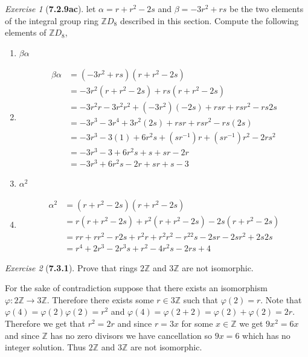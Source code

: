 \documentclass[12pt]{amsart}
\makeatletter
\theoremstyle{remark}
\newtheorem*{exercise}{Exercise}%
\def\ZZ{\ensuremath{\mathbb Z}}
\renewenvironment{proof}[1][\proofname]{\par\doublespacing
  \pushQED{\qed}%
  \normalfont \topsep6\p@\@plus6\p@\relax
  \list{}{%
    \settowidth{\leftmargin}{\itshape\proofname:\hskip\labelsep}%
    \setlength{\labelwidth}{0pt}%
    \setlength{\itemindent}{-\leftmargin}%
  }%
  \item[\hskip\labelsep\itshape#1\@addpunct{:}]\ignorespaces
}{%
  \popQED\endlist\@endpefalse
  \singlespacing
}
\theoremstyle{mycomment}
\makeatother
\begin{document}
\begin{exercise}[\textbf{7.2.9ac}] let $\alpha = r + r^2 - 2s$ and $\beta = -3r^2 + rs$ be the two elements of the integral group ring 
  $\ZZ D_8$ described in this section. Compute the following elements of $\ZZ D_8$,
  \begin{enumerate}
    \item[(a)] $\beta\alpha$
    \begin{proof}
      \begin{align*}
        \beta\alpha &= (-3r^2 + rs)(r + r^2 - 2s)\\
         &= -3r^2(r + r^2 - 2s) + rs(r + r^2 - 2s)\\
         &= -3r^2r - 3r^2r^2 + (-3r^2)(-2s) + rsr + rsr^2 - rs2s\\
         &= -3r^3 - 3r^4 + 3r^2(2s) + rsr + rsr^2 - rs(2s)\\
         &= -3r^3 - 3(1) + 6r^2s + (sr^{-1})r + (sr^{-1})r^2 - 2rs^2\\
         &= -3r^3 - 3 + 6r^2s + s + sr - 2r\\
         &= -3r^3 + 6r^2s - 2r + sr + s - 3
      \end{align*}
    \end{proof}
      \vspace{.15in}


      \item[(c)] $\alpha^2$
      \begin{proof}
        \begin{align*}
          \alpha^2 &= (r + r^2 - 2s)(r + r^2 - 2s)\\
           &= r(r + r^2 - 2s) + r^2(r + r^2 - 2s) - 2s(r + r^2 - 2s)\\
           &= rr + rr^2 - r2s + r^2r + r^2r^2 - r^22s - 2sr - 2sr^2 + 2s2s\\
           &= r^4 + 2r^3 - 2r^3s + r^2 - 4r^2s - 2rs + 4
        \end{align*}
    \end{proof}
    \vspace{.15in}
  \end{enumerate}
\end{exercise}
\vspace{.15in}




\begin{exercise}[\textbf{7.3.1}] Prove that rings $2\ZZ$ and $3\ZZ$ are not isomorphic. 
  \begin{proof} For the sake of contradiction suppose that there exists an isomorphism $\varphi: 2\ZZ \to 3\ZZ$. 
    Therefore there exists some $r \in 3\ZZ$ such that $\varphi(2) = r$. Note that $\varphi(4) = \varphi(2)\varphi(2) = r^2$
    and $\varphi(4) = \varphi(2 + 2) = \varphi(2) + \varphi(2) = 2r$. Therefore we get that $r^2 = 2r$ and since $r = 3x$ for some $x \in \ZZ$ we get $9x^2 = 6x$ and since $\ZZ$ has no zero divisors we have cancellation so $9x = 6$ which has no integer solution. Thus $2\ZZ$ and $3\ZZ$ are not isomorphic. 
    \end{proof}
\end{exercise}
\vspace{.15in}
\end{document}

